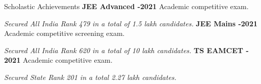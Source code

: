 \begin{rubric}{Scholastic Achievements}
\entry*
	\textbf{JEE Advanced -2021} Academic competitive exam.
	\par \emph{Secured All India Rank 479 in a total of 1.5 lakh candidates.}
%
\entry*
	\textbf{JEE Mains -2021} Academic competitive screening exam.
	\par \emph{Secured All India Rank 620 in a total of 10 lakh candidates.}
\entry*
        \textbf{TS EAMCET - 2021} Academic competitive exam.
        \par \emph{Secured State Rank 201 in a total 2.27 lakh candidates.}
\end{rubric}